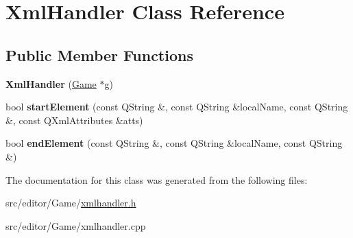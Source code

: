 \hypertarget{class_xml_handler}{\section{\-Xml\-Handler \-Class \-Reference}
\label{class_xml_handler}
}
\subsection*{\-Public \-Member \-Functions}
\begin{DoxyCompactItemize}
\item 
\hypertarget{class_xml_handler_a98cf939ef528aa336c7e4b2ae7f1a431}{{\bfseries \-Xml\-Handler} (\hyperlink{class_game}{\-Game} $\ast$g)}\label{class_xml_handler_a98cf939ef528aa336c7e4b2ae7f1a431}

\item 
\hypertarget{class_xml_handler_a23b06b0d562fa3be82b42f46148a4175}{bool {\bfseries start\-Element} (const \-Q\-String \&, const \-Q\-String \&local\-Name, const \-Q\-String \&, const \-Q\-Xml\-Attributes \&atts)}\label{class_xml_handler_a23b06b0d562fa3be82b42f46148a4175}

\item 
\hypertarget{class_xml_handler_a647d0b062e0d8c8d4b65bfe040dee441}{bool {\bfseries end\-Element} (const \-Q\-String \&, const \-Q\-String \&local\-Name, const \-Q\-String \&)}\label{class_xml_handler_a647d0b062e0d8c8d4b65bfe040dee441}

\end{DoxyCompactItemize}


\-The documentation for this class was generated from the following files\-:\begin{DoxyCompactItemize}
\item 
src/editor/\-Game/\hyperlink{xmlhandler_8h}{xmlhandler.\-h}\item 
src/editor/\-Game/xmlhandler.\-cpp\end{DoxyCompactItemize}
